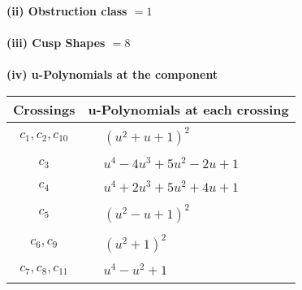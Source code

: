 \documentclass[1p]{elsarticle_modified}
\theoremstyle{definition}
\begin{document}
\flushleft \textbf{(ii) Obstruction class $= 1$}\\~\\
\flushleft \textbf{(iii) Cusp Shapes $= 8$}\\~\\
\newpage\renewcommand{\arraystretch}{1}
\flushleft \textbf{(iv) u-Polynomials at the component}\newline \\
\begin{tabular}{m{50pt}|m{274pt}}
Crossings & \hspace{64pt}u-Polynomials at each crossing \\
\hline $$\begin{aligned}c_{1},c_{2},c_{10}\end{aligned}$$&$\begin{aligned}
&(u^2+u+1)^2
\end{aligned}$\\
\hline $$\begin{aligned}c_{3}\end{aligned}$$&$\begin{aligned}
&u^4-4 u^3+5 u^2-2 u+1
\end{aligned}$\\
\hline $$\begin{aligned}c_{4}\end{aligned}$$&$\begin{aligned}
&u^4+2 u^3+5 u^2+4 u+1
\end{aligned}$\\
\hline $$\begin{aligned}c_{5}\end{aligned}$$&$\begin{aligned}
&(u^2- u+1)^2
\end{aligned}$\\
\hline $$\begin{aligned}c_{6},c_{9}\end{aligned}$$&$\begin{aligned}
&(u^2+1)^2
\end{aligned}$\\
\hline $$\begin{aligned}c_{7},c_{8},c_{11}\end{aligned}$$&$\begin{aligned}
&u^4- u^2+1
\end{aligned}$\\
\hline
\end{tabular}\\~\\
\end{document}
